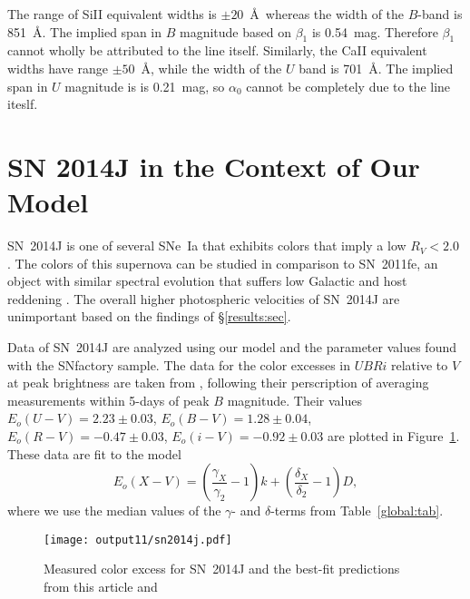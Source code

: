 \documentclass{aastex}   	%
\begin{document}
The range of SiII equivalent widths is $\pm 20$~\AA\ whereas the width of the $B$-band is 851~\AA.  
The implied span in $B$ magnitude based on $\beta_1$ is 0.54~mag.  Therefore $\beta_1$ cannot wholly be attributed to the line itself.
Similarly, the CaII equivalent widths have range $\pm 50$~\AA, while the width of the $U$ band is
701~\AA.  The implied span in $U$ magnitude is is 0.21~mag, so $\alpha_0$ cannot be completely due to the line iteslf.

\section{SN 2014J in the Context of Our Model}
\label{sn2014j:sec}

SN~2014J   is one of several SNe~Ia that exhibits colors that imply a low $R_V<2.0$ \citep{2014ApJ...788L..21A, 2014MNRAS.443.2887F, 
2014ApJ...795L...4K, 2015ApJ...805...74B}.
The colors of this supernova can be studied in comparison to SN~2011fe, an object with similar
spectral evolution that 
suffers low Galactic and host reddening
\citep[e.g.][]{2006MNRAS.369.1880E,2007AJ....133...58K,2008MNRAS.384..107E,2010AJ....139..120F, 2014ApJ...788L..21A}.
The overall higher photospheric velocities of
SN~2014J are unimportant  based on the findings of  \S\ref{results:sec}.


Data of SN~2014J are  analyzed using our model and the parameter values found with the SNfactory sample.
The data for the color excesses  in $UBRi$  relative to $V$ at peak brightness  are taken from \citet{2014ApJ...788L..21A},
following their perscription of averaging measurements within 5-days of peak $B$ magnitude.
Their values 
$E_o(U-V) =   2.23 \pm   0.03$,
$E_o(B-V) =   1.28 \pm   0.04$,
$E_o(R-V) =  -0.47 \pm   0.03$,
$E_o(i-V) =  -0.92 \pm   0.03$
are plotted in Figure~\ref{sn2014j:fig}.
These data are fit to the model
\begin{equation}
E_o(X-V) =  \left(\frac{\gamma_X}{\gamma_2}-1\right)k +  \left(\frac{\delta_X}{\delta_2}-1\right)D,
\end{equation}
where we use the median values of the $\gamma$- and $\delta$-terms from Table~\ref{global:tab}.

\begin{figure}[htbp] %
   \centering
   \texttt{[image: output11/sn2014j.pdf]} 
   \caption{Measured color excess for SN~2014J and the best-fit predictions from this article and  \citet{2014ApJ...788L..21A}  
   \label{sn2014j:fig}}
\end{figure}
\end{document}
